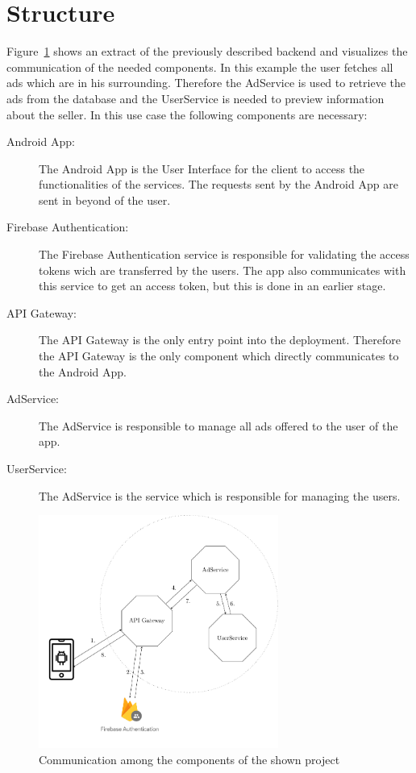 \section{Structure}
Figure~\ref{fig:deployment_structure} shows an extract of the previously described backend and visualizes the communication of the needed components.
In this example the user fetches all ads which are in his surrounding.
Therefore the AdService is used to retrieve the ads from the database and the UserService is needed to preview information about the seller.
In this use case the following components are necessary:
\begin{description}
	\item[Android App:] The Android App is the User Interface for the client to access the functionalities of the services.
		The requests sent by the Android App are sent in beyond of the user.
	\item[Firebase Authentication:] The Firebase Authentication service is responsible for validating the access tokens wich are transferred by the users.
		The app also communicates with this service to get an access token, but this is done in an earlier stage.
	\item[API Gateway:] The API Gateway is the only entry point into the deployment.
		Therefore the API Gateway is the only component which directly communicates to the Android App.
	\item[AdService:] The AdService is responsible to manage all ads offered to the user of the app.
	\item[UserService:] The AdService is the service which is responsible for managing the users. 
\end{description}

\begin{figure}
	\centering
	\includegraphics[width=0.7\textwidth]{images/project-structure/TikZ_structure.pdf}
	\caption{Communication among the components of the shown project}
	\label{fig:deployment_structure}
\end{figure}

